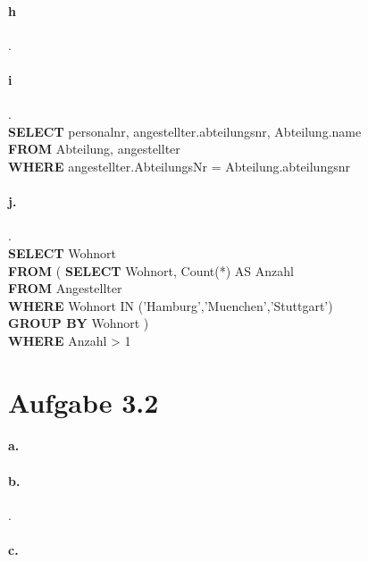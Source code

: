 \documentclass{article}
\begin{document}
		\paragraph*{h}.\\
			
						
			
		
		\paragraph*{i}.\\
			\textbf{SELECT} 
			personalnr, angestellter.abteilungsnr, Abteilung.name\\
			\textbf{FROM} 
			Abteilung, angestellter\\ 
			\textbf{WHERE} angestellter.AbteilungsNr = Abteilung.abteilungsnr
			
		\paragraph*{j.}.\\
			\textbf{SELECT} 
			Wohnort\\
			\textbf{FROM}
			\big(
			\textbf{SELECT}  Wohnort, Count(*) AS Anzahl\\
			\textbf{FROM}  Angestellter\\ 
			\textbf{WHERE}  Wohnort IN ('Hamburg','Muenchen','Stuttgart')\\ 
			\textbf{GROUP BY}  Wohnort
			\big)\\ \textbf{WHERE} Anzahl > 1
			
			
	\pagebreak
	\section*{Aufgabe 3.2}
		\paragraph*{a.}
		
		\paragraph*{b.}.\\
			
		\paragraph*{c.}
		
\end{document}

